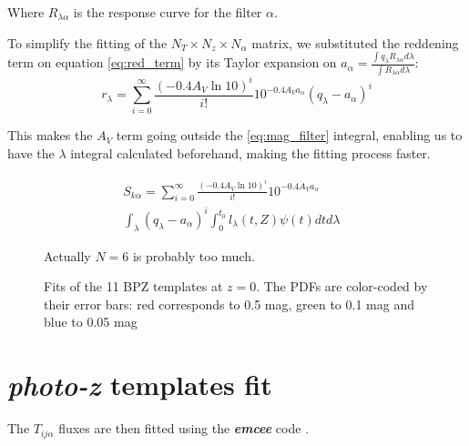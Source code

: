 \documentclass[a4paper, useAMS, usenatbib, hyperpdf]{mn2e}
\begin{document}
Where $R_{\lambda \alpha}$ is the response curve for the filter $\alpha$.

To simplify the fitting of the $N_T \times N_z \times N_\alpha$ matrix, we substituted the reddening term on equation \ref{eq:red_term} by its Taylor expansion on $a_\alpha = \frac{\int q_\lambda R_{\lambda \alpha} d \lambda}{\int R_{\lambda \alpha} d \lambda}$:
\begin{equation}
\label{eq:taylor_exp}
r_\lambda = \sum_{i=0}^\infty \frac{(-0.4 A_V \ln 10)^i}{i!} 10^{-0.4 A_V a_\alpha} (q_\lambda - a_\alpha)^i
\end{equation}

This makes the $A_V$ term going outside the \ref{eq:mag_filter} integral, enabling us to have the $\lambda$ integral calculated beforehand, making the fitting process faster.

\begin{equation}
\label{eq:csp_taylor}
\begin{split}
S_{k \alpha} = \sum_{i=0}^\infty \frac{(-0.4 A_V \ln 10)^i}{i!} 10^{-0.4 A_V a_\alpha} & \\
 \int_\lambda (q_\lambda - a_\alpha)^i \int_0^{t_0} l_\lambda (t, Z) \psi (t)  dt d\lambda
 \end{split}
\end{equation}


\begin{figure}
\caption{Actually $N=6$ is probably too much.}
\end{figure}

\begin{figure*}
\caption{Fits of the 11 BPZ templates at $z=0$. The PDFs are color-coded by their error bars: red corresponds to 0.5 mag, green to 0.1 mag and blue to 0.05 mag}
\end{figure*}



\section{{\it photo-z} templates fit}
\label{sec:fit}

The $T_{ij\alpha}$ fluxes are then fitted using the {\it \bf emcee} code \citep{ForemanMackey.etal.2013a}.
\end{document}
